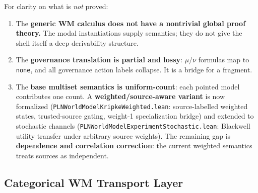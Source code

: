 \documentclass[]{article}
\newcommand{\code}[1]{\texttt{#1}}
\begin{document}
For clarity on what is \emph{not} proved:

\begin{enumerate}[leftmargin=2em]
\item The \textbf{generic WM calculus does not have a nontrivial global
  proof theory.} The modal instantiations supply semantics; they do not
  give the shell itself a deep derivability structure.
\item The \textbf{governance translation is partial and lossy}: $\mu$/$\nu$
  formulas map to \code{none}, and all governance action labels collapse.
  It is a bridge for a fragment.
\item The \textbf{base multiset semantics is uniform-count}: each pointed
  model contributes one count.  A \textbf{weighted/source-aware variant}
  is now formalized (\code{PLNWorldModelKripkeWeighted.lean}:
  source-labelled weighted states, trusted-source gating, weight-1
  specialization bridge) and extended to stochastic channels
  (\code{PLNWorldModelExperimentStochastic.lean}: Blackwell utility
  transfer under arbitrary source weights).  The remaining gap is
  \textbf{dependence and correlation correction}: the current weighted
  semantics treats sources as independent.
\end{enumerate}


\subsection{Categorical WM Transport Layer}
\label{sec:categorical-wm-transport}
\end{document}
